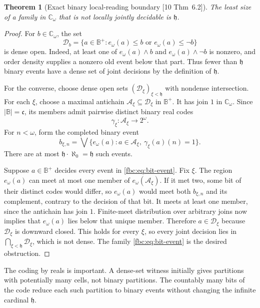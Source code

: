 \documentclass[11pt,letterpaper]{article}
\newtheorem{theorem}{Theorem}[section]
\theoremstyle{definition}
\theoremstyle{remark}
\newcommand{\om}{\omega}
\newcommand{\B}{\mathbb B}
\newcommand{\C}{\mathbb C}
\newcommand{\cc}{\mathfrak c}
\newcommand{\ch}{\mathfrak h}
\newcommand{\src}[1]{\textup{[#1]}}
\begin{document}
\begin{theorem}[Exact binary local-reading boundary \src{10 Thm~6.2}]
\label{fbc:thm:h}
The least size of a family in $\C_\om$ that is not locally jointly
decidable is $\ch$.
\end{theorem}
\begin{proof}
For $b\in\C_\om$, the set
\[
 \mathcal D_b=\{a\in\B^+:e_\om(a)\leq b\text{ or }e_\om(a)\leq\neg b\}
\]
is dense open. Indeed, at least one of $e_\om(a)\wedge b$ and
$e_\om(a)\wedge\neg b$ is nonzero, and order density supplies a nonzero
old event below that part. Thus fewer than $\ch$ binary events have
a dense set of joint decisions by the definition of $\ch$.

For the converse, choose dense open sets
$(\mathcal D_\xi)_{\xi<\ch}$ with nondense intersection. For each $\xi$,
choose a maximal antichain $\mathcal A_\xi\subseteq\mathcal D_\xi$ in
$\B^+$. It has join $1$ in $\C_\om$. Since $|\B|=\cc$, its members admit
pairwise distinct binary real codes
\[
 \gamma_\xi:\mathcal A_\xi\longrightarrow 2^\om.
\]
For $n<\om$, form the completed binary event
\begin{equation}\label{fbc:eq:bit-event}
 b_{\xi,n}=\bigvee\{e_\om(a):a\in\mathcal A_\xi,
                                      \ \gamma_\xi(a)(n)=1\}.
\end{equation}
There are at most $\ch\cdot\aleph_0=\ch$ such events.

Suppose $a\in\B^+$ decides every event in \eqref{fbc:eq:bit-event}.
Fix $\xi$. The region $e_\om(a)$ can meet at most one member of
$e_\om(\mathcal A_\xi)$. If it met two, some bit of their distinct codes
would differ, so $e_\om(a)$ would meet both $b_{\xi,n}$ and its
complement, contrary to the decision of that bit. It meets at least
one member, since the antichain has join $1$. Finite-meet distribution
over arbitrary joins now implies that $e_\om(a)$ lies below that unique
member. Therefore $a\in\mathcal D_\xi$ because $\mathcal D_\xi$ is
downward closed. This holds for every $\xi$, so every joint decision lies
in $\bigcap_{\xi<\ch}\mathcal D_\xi$, which is not dense. The family
\eqref{fbc:eq:bit-event} is the desired obstruction.
\end{proof}

The coding by reals is important. A dense-set witness initially gives
partitions with potentially many cells, not binary partitions. The
countably many bits of the code reduce each such partition to binary
events without changing the infinite cardinal $\ch$.
\end{document}
